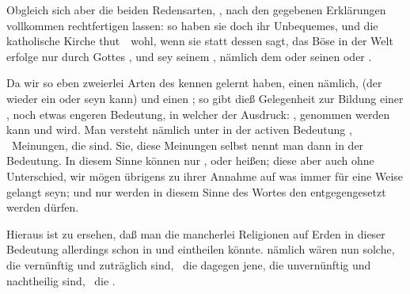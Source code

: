 \begin{aufza}
\begin{aufzb}
\begin{aufzc}
\begin{RWanm}
Obgleich sich aber die beiden Redensarten, , nach den gegebenen Erklärungen vollkommen rechtfertigen lassen: so haben sie doch ihr Unbequemes, und die katholische Kirche thut~\ wohl, wenn sie statt dessen sagt, das Böse in der Welt erfolge nur durch Gottes , und sey seinem , nämlich dem  oder seinen  oder  .
\end{RWanm}
\end{aufzc}
\end{aufzb}
\end{aufza}

Da wir so eben zweierlei Arten des  kennen gelernt haben, einen  nämlich, (der wieder ein  oder  seyn kann) und einen ; so gibt dieß Gelegenheit zur Bildung einer , noch etwas engeren Bedeutung, in welcher der Ausdruck: , genommen werden kann und wird. Man versteht nämlich unter  in der activen Bedeutung , \dh\ Meinungen, die  sind. Sie, diese Meinungen selbst nennt man dann  in der  Bedeutung. In diesem Sinne können nur , oder  heißen; diese aber auch ohne Unterschied, wir mögen übrigens zu ihrer Annahme auf was immer für eine Weise gelangt seyn; und nur  werden in diesem Sinne des Wortes den  entgegengesetzt werden dürfen.\par
Hieraus ist zu ersehen, daß man die mancherlei Religionen auf Erden in dieser Bedeutung allerdings schon in  und  eintheilen könnte.  nämlich wären nun solche, die vernünftig und zuträglich sind, \zB\ die  dagegen jene, die unvernünftig und nachtheilig sind, \zB\ die .\par
